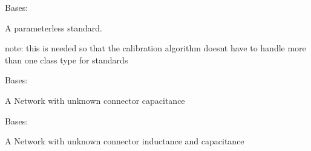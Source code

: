 \documentclass[letterpaper,10pt,english]{sphinxmanual}
\begin{document}

\begin{fulllineitems}
\label{api/mwavepy.calibration.parametricStandard:mwavepy.calibration.parametricStandard.generic.Parameterless}
Bases: {\hyperref[api/mwavepy.calibration.parametricStandard:mwavepy.calibration.parametricStandard.parametricStandard.ParametricStandard]{}}

A parameterless standard.

note:
this is needed so that the calibration algorithm doesnt have to
handle more than one class type for  standards

\end{fulllineitems}


\begin{fulllineitems}
\label{api/mwavepy.calibration.parametricStandard:mwavepy.calibration.parametricStandard.generic.UnknownShuntCapacitance}
Bases: {\hyperref[api/mwavepy.calibration.parametricStandard:mwavepy.calibration.parametricStandard.parametricStandard.ParametricStandard]{}}

A Network with unknown connector capacitance

\end{fulllineitems}


\begin{fulllineitems}
\label{api/mwavepy.calibration.parametricStandard:mwavepy.calibration.parametricStandard.generic.UnknownShuntCapacitanceInductance}
Bases: {\hyperref[api/mwavepy.calibration.parametricStandard:mwavepy.calibration.parametricStandard.parametricStandard.ParametricStandard]{}}

A Network with unknown connector inductance and capacitance

\end{fulllineitems}
\end{document}

